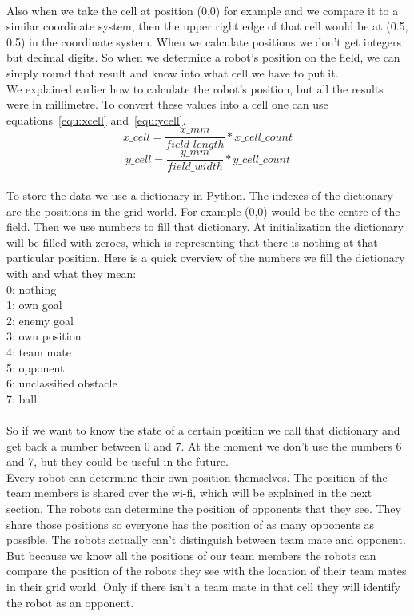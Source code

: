 \documentclass[lnicst,a4paper]{svmultln}
\begin{document}
\\
Also when we take the cell at position (0,0) for example and we compare it to a similar coordinate system, then the upper right edge of that cell would be at (0.5, 0.5) in the coordinate system. When we calculate positions we don't get integers but decimal digits. 
So when we determine a robot's position on the field, we can simply round that result and know into what cell we have to put it.
\\
We explained earlier how to calculate the robot's position, but all the results were in millimetre. To convert these values into a cell one can use equations~\ref{equ:xcell} and~\ref{equ:ycell}.
\begin{equation}
	x\_cell = \frac{x\_mm}{field\_length} * x\_cell\_count
	\label{equ:xcell}
\end{equation}
\begin{equation}
	y\_cell = \frac{y\_mm}{field\_width} * y\_cell\_count
	\label{equ:ycell}
\end{equation}
\\
To store the data we use a dictionary in Python. The indexes of the dictionary are the positions in the grid world. For example (0,0) would be the centre of the field. Then we use numbers to fill that dictionary. At initialization the dictionary will be filled with zeroes, which is representing that there is nothing at that particular position. Here is a quick overview of the numbers we fill the dictionary with and what they mean:\\
0: nothing\\
1: own goal\\
2: enemy goal\\
3: own position\\
4: team mate\\
5: opponent\\
6: unclassified obstacle\\
7: ball\\
\\
So if we want to know the state of a certain position we call that dictionary and get back a number between 0 and 7. At the moment we don't use the numbers 6 and 7, but they could be useful in the future.
\\
Every robot can determine their own position themselves. The position of the team members is shared over the wi-fi, which will be explained in the next section. The robots can determine the position of opponents that they see. They share those positions so everyone has the position of as many opponents as possible. The robots actually can't distinguish between team mate and opponent. But because we know all the positions of our team members the robots can compare the position of the robots they see with the location of their team mates in their grid world. Only if there isn't a team mate in that cell they will identify the robot as an opponent. 
\end{document}
